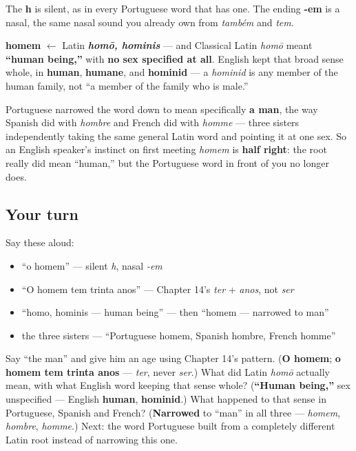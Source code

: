 The \textbf{h} is silent, as in every Portuguese word that has one. The ending \textbf{-em} is a nasal, the same nasal sound you already own from \emph{também} and \emph{tem}.

\begin{cousinweb}
\textbf{homem} $\leftarrow$ Latin \emph{\textbf{homō, hominis}} — and Classical Latin \emph{homō} meant \textbf{\textquotedblleft{}human being,\textquotedblright{}} with \textbf{no sex specified at all}. English kept that broad sense whole, in \textbf{human}, \textbf{humane}, and \textbf{hominid} — a \emph{hominid} is any member of the human family, not \textquotedblleft{}a member of the family who is male.\textquotedblright{}

Portuguese narrowed the word down to mean specifically \textbf{a man}, the way Spanish did with \emph{hombre} and French did with \emph{homme} — three sisters independently taking the same general Latin word and pointing it at one sex. So an English speaker's instinct on first meeting \emph{homem} is \textbf{half right}: the root really did mean \textquotedblleft{}human,\textquotedblright{} but the Portuguese word in front of you no longer does.
\end{cousinweb}

\subsection*{Your turn}
Say these aloud:

\begin{itemize}
\raggedright
  \item \textquotedblleft{}o homem\textquotedblright{} — silent \emph{h}, nasal \emph{-em}
  \item \textquotedblleft{}O homem tem trinta anos\textquotedblright{} — Chapter 14's \emph{ter} + \emph{anos}, not \emph{ser}
  \item \textquotedblleft{}homo, hominis — human being\textquotedblright{} — then \textquotedblleft{}homem — narrowed to man\textquotedblright{}
  \item the three sisters — \textquotedblleft{}Portuguese homem, Spanish hombre, French homme\textquotedblright{}
\end{itemize}

\begin{tcolorbox}[breakable,colback=teal!4,colframe=teal!35!black,title={Before you move on}]
Say \textquotedblleft{}the man\textquotedblright{} and give him an age using Chapter 14's pattern. (\textbf{O homem}; \textbf{o homem tem trinta anos} — \emph{ter}, never \emph{ser}.) What did Latin \emph{homō} actually mean, with what English word keeping that sense whole? (\textbf{\textquotedblleft{}Human being,\textquotedblright{}} sex unspecified — English \textbf{human}, \textbf{hominid}.) What happened to that sense in Portuguese, Spanish and French? (\textbf{Narrowed} to \textquotedblleft{}man\textquotedblright{} in all three — \emph{homem}, \emph{hombre}, \emph{homme}.) Next: the word Portuguese built from a completely different Latin root instead of narrowing this one.
\end{tcolorbox}
